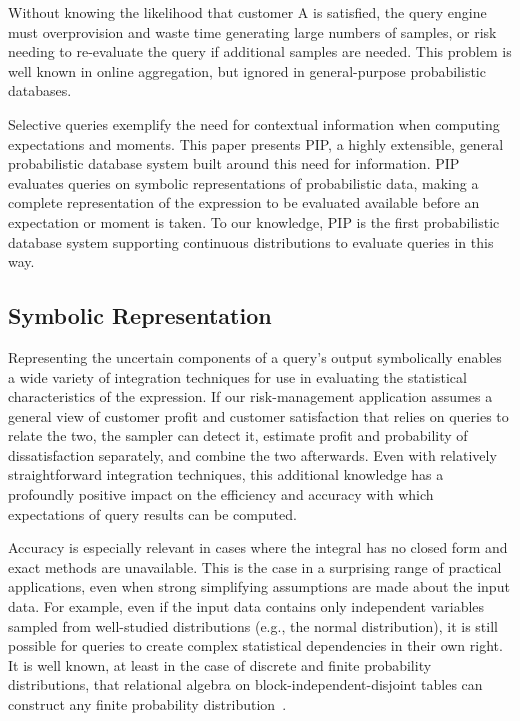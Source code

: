 Without knowing the likelihood that customer A is satisfied, the query engine must overprovision and waste time generating large numbers of samples, or risk needing to re-evaluate the query if additional samples are needed.  This problem is well known in online aggregation, but ignored in general-purpose probabilistic databases.  

Selective queries exemplify the need for contextual information when computing expectations and moments.  This paper presents PIP, a highly extensible, general probabilistic database system built around this need for information.  PIP evaluates queries on symbolic representations of probabilistic data, making a complete representation of the expression to be evaluated available before an expectation or moment is taken.  To our knowledge, PIP is the first probabilistic database system supporting continuous distributions to evaluate queries in this way.

\subsection{Symbolic Representation}
Representing the uncertain components of a query's output symbolically enables a wide variety of integration techniques for use in evaluating the statistical characteristics of the expression.  If our risk-management application assumes a general view of customer profit and customer satisfaction that relies on queries to relate the two, the sampler can detect it, estimate profit and probability of dissatisfaction separately, and combine the two afterwards.  Even with relatively straightforward integration techniques, this additional knowledge has a profoundly positive impact on the efficiency and accuracy with which expectations of query results can be computed.

Accuracy is especially relevant in cases where the integral has no closed form and exact methods are unavailable.  This is the case in a surprising range of practical applications, even when strong simplifying assumptions are made about the input data.  For example, even if the input data contains only independent variables sampled from well-studied distributions (e.g., the normal distribution), it is still possible for queries to create complex statistical dependencies in their own right.  It is well known, at least in the case of discrete and finite probability distributions, that relational algebra on block-independent-disjoint tables can construct any finite probability distribution\ \cite{1325861,IL1984}.

